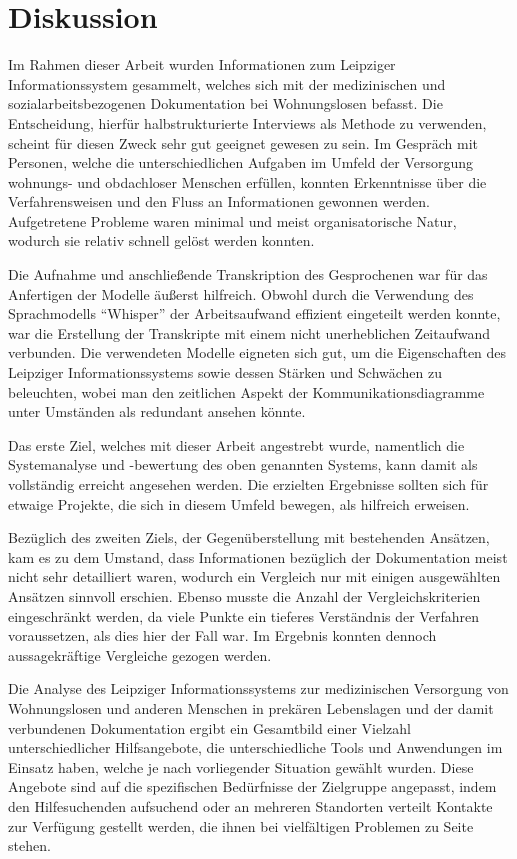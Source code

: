 \chapter{Diskussion}\label{ch:discussion}

Im Rahmen dieser Arbeit wurden Informationen zum Leipziger Informationssystem gesammelt, welches sich mit der medizinischen und sozialarbeitsbezogenen Dokumentation bei Wohnungslosen befasst. Die Entscheidung, hierfür halbstrukturierte Interviews als Methode zu verwenden, scheint für diesen Zweck sehr gut geeignet gewesen zu sein. Im Gespräch mit Personen, welche die unterschiedlichen Aufgaben im Umfeld der Versorgung wohnungs- und obdachloser Menschen erfüllen, konnten Erkenntnisse über die Verfahrensweisen und den Fluss an Informationen gewonnen werden. Aufgetretene Probleme waren minimal und meist organisatorische Natur, wodurch sie relativ schnell gelöst werden konnten.

Die Aufnahme und anschließende Transkription des Gesprochenen war für das Anfertigen der Modelle äußerst hilfreich. Obwohl durch die Verwendung des Sprachmodells \enquote{Whisper} der Arbeitsaufwand effizient eingeteilt werden konnte, war die Erstellung der Transkripte mit einem nicht unerheblichen Zeitaufwand verbunden. Die verwendeten Modelle eigneten sich gut, um die Eigenschaften des Leipziger Informationssystems sowie dessen Stärken und Schwächen zu beleuchten, wobei man den zeitlichen Aspekt der Kommunikationsdiagramme unter Umständen als redundant ansehen könnte.

Das erste Ziel, welches mit dieser Arbeit angestrebt wurde, namentlich die Systemanalyse und -bewertung des oben genannten Systems, kann damit als vollständig erreicht angesehen werden. Die erzielten Ergebnisse sollten sich für etwaige Projekte, die sich in diesem Umfeld bewegen, als hilfreich erweisen.

Bezüglich des zweiten Ziels, der Gegenüberstellung mit bestehenden Ansätzen, kam es zu dem Umstand, dass Informationen bezüglich der Dokumentation meist nicht sehr detailliert waren, wodurch ein Vergleich nur mit einigen ausgewählten Ansätzen sinnvoll erschien. Ebenso musste die Anzahl der Vergleichskriterien eingeschränkt werden, da viele Punkte ein tieferes Verständnis der Verfahren voraussetzen, als dies hier der Fall war. Im Ergebnis konnten dennoch aussagekräftige Vergleiche gezogen werden.

Die Analyse des Leipziger Informationssystems zur medizinischen Versorgung von Wohnungslosen und anderen Menschen in prekären Lebenslagen und der damit verbundenen Dokumentation ergibt ein Gesamtbild einer Vielzahl unterschiedlicher Hilfsangebote, die unterschiedliche Tools und Anwendungen im Einsatz haben, welche je nach vorliegender Situation gewählt wurden. Diese Angebote sind auf die spezifischen Bedürfnisse der Zielgruppe angepasst, indem den Hilfesuchenden aufsuchend oder an mehreren Standorten verteilt Kontakte zur Verfügung gestellt werden, die ihnen bei vielfältigen Problemen zu Seite stehen.

